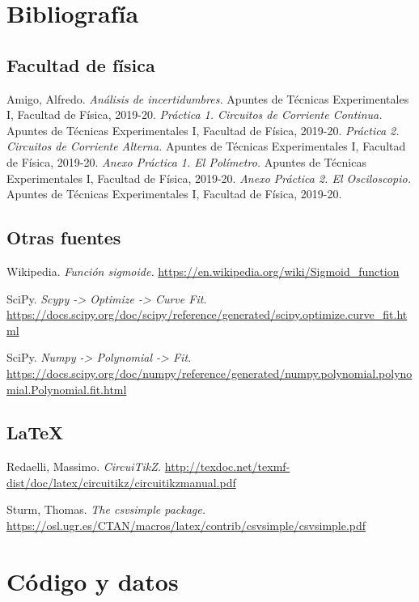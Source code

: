 \documentclass[12pt, a4paper, titlepage]{article}
\begin{document}
\begin{appendices}
    \section{Bibliografía}

    \subsection{Facultad de física}

    Amigo, Alfredo. \textit{Análisis de incertidumbres.} Apuntes de Técnicas Experimentales I, Facultad de Física, 2019-20.
    \textit{Práctica 1. Circuitos de Corriente Continua.} Apuntes de Técnicas Experimentales I, Facultad de Física, 2019-20.
    \textit{Práctica 2. Circuitos de Corriente Alterna.} Apuntes de Técnicas Experimentales I, Facultad de Física, 2019-20.
    \textit{Anexo Práctica 1. El Polímetro.} Apuntes de Técnicas Experimentales I, Facultad de Física, 2019-20.
    \textit{Anexo Práctica 2. El Osciloscopio.} Apuntes de Técnicas Experimentales I, Facultad de Física, 2019-20.

    \subsection{Otras fuentes}

    Wikipedia. \textit{Función sigmoide.} \url{https://en.wikipedia.org/wiki/Sigmoid_function}

    SciPy. \textit{Scypy -> Optimize -> Curve Fit.} \url{https://docs.scipy.org/doc/scipy/reference/generated/scipy.optimize.curve_fit.html}

    SciPy. \textit{Numpy -> Polynomial -> Fit.} \url{https://docs.scipy.org/doc/numpy/reference/generated/numpy.polynomial.polynomial.Polynomial.fit.html}

    \subsection{LaTeX}

    Redaelli, Massimo. \textit{CircuiTikZ.} \url{http://texdoc.net/texmf-dist/doc/latex/circuitikz/circuitikzmanual.pdf}

    Sturm, Thomas. \textit{The csvsimple package.} \url{https://osl.ugr.es/CTAN/macros/latex/contrib/csvsimple/csvsimple.pdf}

    \section{Código y datos}


\end{appendices}
\end{document}
